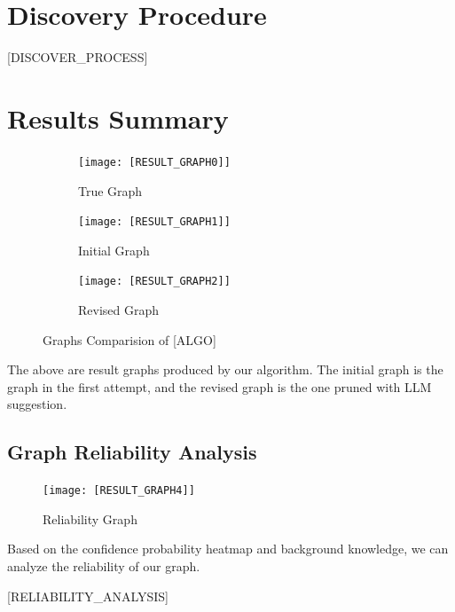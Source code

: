 \documentclass{article}
\begin{document}
\section{Discovery Procedure}
[DISCOVER_PROCESS]

\section{Results Summary}

\begin{figure}[H]
    \centering
    \begin{subfigure}{0.3\textwidth}
        \centering
        \vspace{-0.5cm}
        \texttt{[image: [RESULT\_GRAPH0]]}
        \vfill
        \caption{True Graph}
        \label{fig:sub1}
    \end{subfigure}
    \hspace{0.04\textwidth}
    \begin{subfigure}{0.3\textwidth}
        \centering
        \vspace{-0.5cm}
        \texttt{[image: [RESULT\_GRAPH1]]}
        \vfill
        \caption{Initial Graph}
        \label{fig:sub2}
    \end{subfigure}
    \hspace{0.04\textwidth}
    \begin{subfigure}{0.3\textwidth}
        \centering
        \vspace{-0.5cm}
        \texttt{[image: [RESULT\_GRAPH2]]}
        \vfill
        \caption{Revised Graph}
        \label{fig:sub3}
    \end{subfigure}
    \caption{Graphs Comparision of [ALGO]}
    \label{fig:main}
\end{figure}

The above are result graphs produced by our algorithm.
The initial graph is the graph in the first attempt, and the revised graph is the one pruned with LLM suggestion.

\subsection{Graph Reliability Analysis}

\begin{figure}[H]
        \centering
        \vspace{-0.5cm}
        \texttt{[image: [RESULT\_GRAPH4]]}
        \caption{Reliability Graph}
        \label{fig:sub3}
\end{figure}

Based on the confidence probability heatmap and background knowledge, we can analyze the reliability of our graph.

[RELIABILITY_ANALYSIS]

\end{document}
